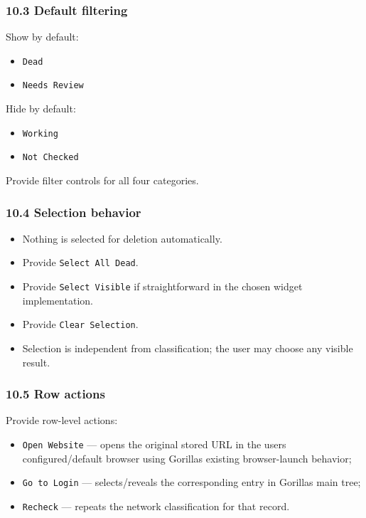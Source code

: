 \documentclass[
  letterpaper,
]{article}
\newcommand{\passthrough}[1]{#1}
\providecommand{\tightlist}{%
  \setlength{\itemsep}{0pt}\setlength{\parskip}{0pt}}
\begin{document}
\subsubsection{10.3 Default filtering}\label{103-default-filtering}

Show by default:

\begin{itemize}
\tightlist
\item
  \passthrough{\lstinline!Dead!}
\item
  \passthrough{\lstinline!Needs Review!}
\end{itemize}

Hide by default:

\begin{itemize}
\tightlist
\item
  \passthrough{\lstinline!Working!}
\item
  \passthrough{\lstinline!Not Checked!}
\end{itemize}

Provide filter controls for all four categories.

\subsubsection{10.4 Selection behavior}\label{104-selection-behavior}

\begin{itemize}
\tightlist
\item
  Nothing is selected for deletion automatically.
\item
  Provide \passthrough{\lstinline!Select All Dead!}.
\item
  Provide \passthrough{\lstinline!Select Visible!} if straightforward in the chosen widget implementation.
\item
  Provide \passthrough{\lstinline!Clear Selection!}.
\item
  Selection is independent from classification; the user may choose any visible result.
\end{itemize}

\subsubsection{10.5 Row actions}\label{105-row-actions}

Provide row-level actions:

\begin{itemize}
\tightlist
\item
  \passthrough{\lstinline!Open Website!} --- opens the original stored URL in the user\textquotesingle s
  configured/default browser using Gorilla\textquotesingle s existing browser-launch behavior;
\item
  \passthrough{\lstinline!Go to Login!} --- selects/reveals the corresponding entry in Gorilla\textquotesingle s main
  tree;
\item
  \passthrough{\lstinline!Recheck!} --- repeats the network classification for that record.
\end{itemize}
\end{document}
